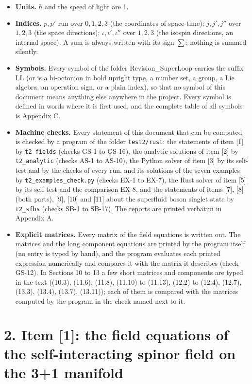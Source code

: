 \documentclass[
  10pt,
]{article}
\providecommand{\tightlist}{%
  \setlength{\itemsep}{0pt}\setlength{\parskip}{0pt}}
\begin{document}
\begin{itemize}
\tightlist
\item
  \textbf{Units.} \(\hbar\) and the speed of light are 1.
\item
  \textbf{Indices.} \(p,p'\) run over \(0,1,2,3\) (the coordinates of
  space-time); \(j,j',j''\) over \(1,2,3\) (the space directions);
  \(\iota,\iota',\iota''\) over \(1,2,3\) (the isospin directions, an
  internal space). A sum is always written with its sign \(\sum\);
  nothing is summed silently.
\item
  \textbf{Symbols.} Every symbol of the folder Revision\_SuperLoop
  carries the suffix LL (or is a bi-octonion in bold upright type, a
  number set, a group, a Lie algebra, an operation sign, or a plain
  index), so that no symbol of this document means anything else
  anywhere in the project. Every symbol is defined in words where it is
  first used, and the complete table of all symbols is Appendix C.
\item
  \textbf{Machine checks.} Every statement of this document that can be
  computed is checked by a program of the folder \texttt{test2/rust}:
  the statements of item {[}1{]} by \texttt{t2\_fields} (checks GS-1 to
  GS-16), the analytic solutions of item {[}2{]} by
  \texttt{t2\_analytic} (checks AS-1 to AS-10), the Python solver of
  item {[}3{]} by its self-test and by the checks of every run, and its
  solutions of the seven examples by \texttt{t2\_examples\_check.py}
  (checks EX-1 to EX-7), the Rust solver of item {[}5{]} by its
  self-test and the comparison EX-8, and the statements of items
  {[}7{]}, {[}8{]} (both parts), {[}9{]}, {[}10{]} and {[}11{]} about
  the superfluid boson singlet state by \texttt{t2\_sfbs} (checks SB-1
  to SB-17). The reports are printed verbatim in Appendix A.
\item
  \textbf{Explicit matrices.} Every matrix of the field equations is
  written out. The matrices and the long component equations are printed
  by the program itself (no entry is typed by hand), and the program
  evaluates each printed expression numerically and compares it with the
  matrix it describes (check GS-12). In Sections 10 to 13 a few short
  matrices and components are typed in the text ((10.3), (11.6), (11.8),
  (11.10) to (11.13), (12.2) to (12.4), (12.7), (13.3), (13.4), (13.7),
  (13.11)); each of them is compared with the matrices computed by the
  program in the check named next to it.
\end{itemize}

\hypertarget{item-1-the-field-equations-of-the-self-interacting-spinor-field-on-the-31-manifold}{%
\section{2. Item {[}1{]}: the field equations of the self-interacting
spinor field on the 3+1
manifold}\label{item-1-the-field-equations-of-the-self-interacting-spinor-field-on-the-31-manifold}}
\end{document}
